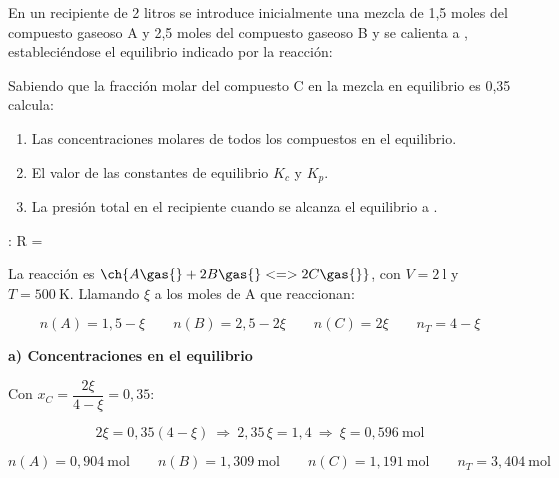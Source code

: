 \begin{exerciseEVAU}
    En un recipiente de 2 litros se introduce inicialmente una mezcla de 1,5 moles del compuesto gaseoso A y 2,5 moles del compuesto gaseoso B y se calienta a , estableciéndose el equilibrio indicado por la reacción:
    \begin{center}
    \end{center}
    Sabiendo que la fracción molar del compuesto C en la mezcla en equilibrio es 0,35 calcula:
    \begin{enumerate}[label=\letraminuscula]
\item Las concentraciones molares de todos los compuestos en el equilibrio.
\item El valor de las constantes de equilibrio \(K_c\) y \(K_p\).
\item La presión total en el recipiente cuando se alcanza el equilibrio a .
    \end{enumerate}
    \datos{}: R = \ctegases

    \begin{solu}

        La reacción es \(\ch{A \gas{} + 2 B \gas{} <=> 2 C \gas{}}\), con \(V = \SI{2}{\litre}\) y \(T = \SI{500}{\kelvin}\). Llamando \(\xi\) a los moles de A que reaccionan:

        \begin{equation*}
            n(A) = 1,5-\xi \qquad n(B) = 2,5-2\xi \qquad n(C) = 2\xi \qquad n_T = 4 - \xi
        \end{equation*}

        \textbf{a) Concentraciones en el equilibrio}

        Con \(x_C = \dfrac{2\xi}{4-\xi} = 0,35\):

        \begin{equation*}
            2\xi = 0,35(4-\xi) \ \Rightarrow \ 2,35\, \xi = 1,4 \ \Rightarrow \ \xi = 0,596 \ \text{mol}
        \end{equation*}

        \begin{equation*}
            n(A) = 0,904 \ \text{mol} \qquad n(B) = 1,309 \ \text{mol} \qquad n(C) = 1,191 \ \text{mol} \qquad n_T = 3,404 \ \text{mol}
        \end{equation*}


\end{solu}
\end{exerciseEVAU}
